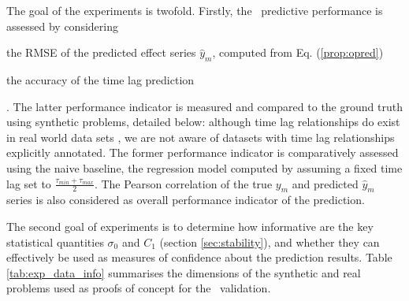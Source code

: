 The goal of the experiments is twofold. Firstly, the \XX\ predictive performance is assessed by 
considering 
%
\begin{enumerate*} 
  \item the RMSE of the predicted effect series $\hat y_m$, computed from Eq. (\ref{prop:opred})  
  \item the accuracy of the time lag prediction 
\end{enumerate*}. 
%
The latter performance indicator is measured and compared to the ground truth using synthetic 
problems, detailed below: although time lag relationships do exist in real world data sets 
\citep{doi:10.1002/jgra.50429,ZHOU2006195}, we are not aware of datasets with time lag 
relationships explicitly annotated. The former performance indicator is comparatively assessed 
using the naive baseline, the regression model computed by assuming a fixed time lag set to 
$\frac{\tau_{min}+\tau_{max}}{2}$. The Pearson correlation of the true $y_m$ and predicted 
$\hat y_m$ series is also considered as overall performance indicator of the prediction.

The second goal of experiments is to determine how informative are the key statistical quantities 
$\sigma_0$ and $C_1$ (section \ref{sec:stability}), and whether they can effectively be used as 
measures of confidence about the prediction results. Table \ref{tab:exp_data_info} summarises the 
dimensions of the synthetic and real problems used as proofs of concept for the \XX\ validation. 

